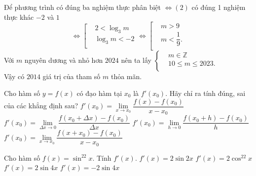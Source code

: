 \begin{ex}
{	Để phương trình có  đúng ba nghiệm thực phân biệt
	$\Leftrightarrow (2)$ có đúng 1 nghiệm thực khác $-2$ và  $1$\\
	$$\Leftrightarrow \left[\begin{aligned}
	& 2<\log_3m  \\
	 & \log_3m<-2 \\
	\end{aligned} \right. \Leftrightarrow
	\left[\begin{aligned}
	& m>9  \\
	 & m<\dfrac{1}{9}. \\
	\end{aligned} \right.$$
	Với  $m$ nguyên dương và nhỏ hơn $2024$ nên ta lấy
	$\left\{ \begin{aligned}
	& m\in \mathbb{Z} \\ 
	& 10\le m\le 2023.  \\
	\end{aligned} \right.$\\
	Vậy có $2014$ giá trị của tham  số $m$ thỏa mãn.
	} 
\end{ex}

\begin{ex}%
 Cho hàm số $y=f(x)$ có đạo hàm tại $x_0$ là $f'(x_0)$.  Hãy chỉ ra tính đúng, sai của các khẳng định sau?
 \choiceTF 
  {\True  $f'(x_0)=\lim \limits_{x\to x_0} \dfrac{f(x)-f(x_0)}{x-x_0}$}
  {\True  $f'(x_0)=\lim \limits_{\Delta x\to 0} \dfrac{f(x_0+\Delta x)-f(x_0)}{\Delta x}$}
   {\True $f'(x_0)=\lim \limits_{h\to 0} \dfrac{f(x_0+h)-f(x_0)}{h}$}
  {$f'(x_0)=\lim \limits_{x\to x_0} \dfrac{f(x+x_0)-f(x_0)}{x-x_0}$} 
\end{ex}

\begin{ex}%
	Cho hàm  số $f(x)=\sin^22x$. Tính $f'(x)$.
	\choice 
		 {$f'(x)=2\sin2x$}
		 {$f'(x)=2\cos^22x$}
		{\True  $f'(x)=2\sin4x$}
		 {$f'(x)=-2\sin4x$}
\end{ex}


